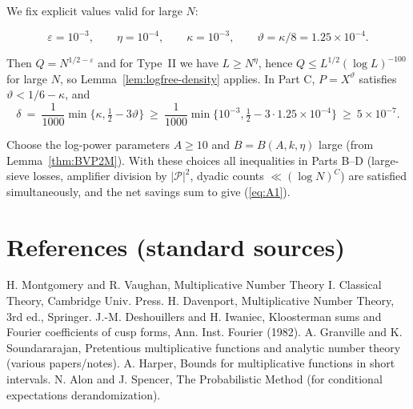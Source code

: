 \documentclass[11pt]{article}
\def\eqref#1{(\ref{#1})}%
\theoremstyle{definition}
\theoremstyle{remark}
\numberwithin{equation}{part}
\begin{document}
We fix explicit values valid for large $N$:

\[
	\varepsilon=10^{-3},\qquad \eta=10^{-4},\qquad \kappa=10^{-3},\qquad \vartheta=\kappa/8=1.25\times 10^{-4}.
\]

Then $Q=N^{1/2-\varepsilon}$ and for Type~II we have $L\ge N^{\eta}$, hence $Q\le L^{1/2}(\log L)^{-100}$ for large $N$, so Lemma~\ref{lem:logfree-density} applies. In Part C, $P=X^{\vartheta}$ satisfies $\vartheta<1/6-\kappa$, and
\[
	\delta\ =\ \frac1{1000}\min\{\kappa,\tfrac12-3\vartheta\}\ \ge\ \frac{1}{1000}\min\{10^{-3},\tfrac12-3\cdot 1.25\times 10^{-4}\}\ \ge\ 5\times 10^{-7}.
\]

Choose the log-power parameters $A\ge 10$ and $B=B(A,k,\eta)$ large (from Lemma~\ref{thm:BVP2M}). With these choices all inequalities in Parts B--D (large-sieve losses, amplifier division by $|\mathcal P|^2$, dyadic counts $\ll (\log N)^C$) are satisfied simultaneously, and the net savings sum to give \eqref{eq:A1}.


\section*{References (standard sources)}
H. Montgomery and R. Vaughan, Multiplicative Number Theory I. Classical Theory, Cambridge Univ. Press.
H. Davenport, Multiplicative Number Theory, 3rd ed., Springer.
J.-M. Deshouillers and H. Iwaniec, Kloosterman sums and Fourier coefficients of cusp forms, Ann. Inst. Fourier (1982).
A. Granville and K. Soundararajan, Pretentious multiplicative functions and analytic number theory (various papers/notes).
A. Harper, Bounds for multiplicative functions in short intervals.
N. Alon and J. Spencer, The Probabilistic Method (for conditional expectations derandomization).


\end{document}
